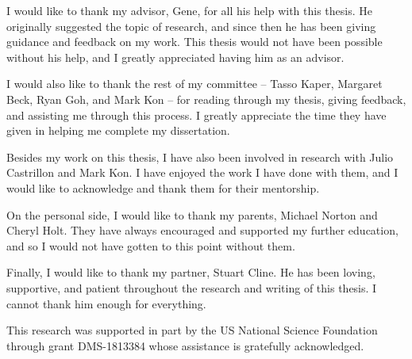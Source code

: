 

I would like to thank my advisor, Gene, for all his help with this thesis. He originally suggested the topic of research, and since then he has been giving guidance and feedback on my work. This thesis would not have been possible without his help, and I greatly appreciated having him as an advisor.

I would also like to thank the rest of my committee -- Tasso Kaper, Margaret Beck, Ryan Goh, and Mark Kon -- for reading through my thesis, giving feedback, and assisting me through this process. I greatly appreciate the time they have given in helping me complete my dissertation.

Besides my work on this thesis, I have also been involved in research with Julio Castrillon and Mark Kon. I have enjoyed the work I have done with them, and I would like to acknowledge and thank them for their mentorship.

On the personal side, I would like to thank my parents, Michael Norton and Cheryl Holt. They have always encouraged and supported my further education, and so I would not have gotten to this point without them.

Finally, I would like to thank my partner, Stuart Cline. He has been loving, supportive, and patient throughout the research and writing of this thesis. I cannot thank him enough for everything.

\bigskip

This research was supported in part by the US National Science Foundation through grant DMS-1813384 whose assistance is gratefully acknowledged.




